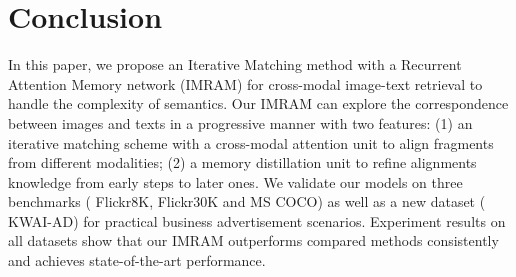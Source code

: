 \documentclass[10pt,twocolumn,letterpaper]{article}
\newcommand{\Ads}{KWAI-AD}
\begin{document}
\section{Conclusion}
In this paper, we propose an Iterative Matching method with a Recurrent Attention Memory network (IMRAM) for cross-modal image-text retrieval to handle the complexity of semantics. Our IMRAM can explore the correspondence between images and texts in a progressive manner with two features: (1) an iterative matching scheme with a cross-modal attention unit to align fragments from different modalities; (2) a memory distillation unit to refine alignments knowledge from early steps to later ones. We validate our models on three benchmarks (\ie{} Flickr8K, Flickr30K and MS COCO) as well as a new dataset (\ie{} \Ads{}) for practical business advertisement scenarios. Experiment results on all datasets show that our IMRAM outperforms compared methods consistently and achieves state-of-the-art performance.

{\small


}
\end{document}
